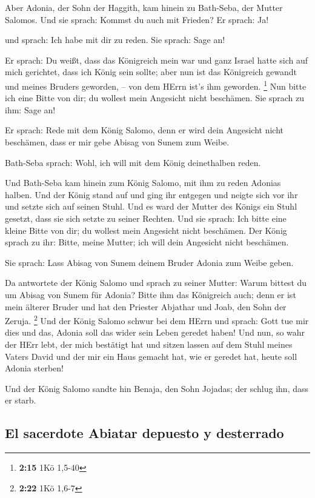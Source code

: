  Aber Adonia, der Sohn der Haggith, kam hinein zu
Bath-Seba, der Mutter Salomos. Und sie sprach: Kommst du auch mit
Frieden? Er sprach: Ja!

 und sprach: Ich habe mit dir zu reden. Sie sprach: Sage
an!

 Er sprach: Du weißt, dass das Königreich mein war und
ganz Israel hatte sich auf mich gerichtet, dass ich König sein sollte;
aber nun ist das Königreich gewandt und meines Bruders geworden, -- von
dem HErrn ist's ihm geworden. \footnote{\textbf{2:15} 1Kö 1,5-40}
 Nun bitte ich eine Bitte von dir; du wollest mein
Angesicht nicht beschämen. Sie sprach zu ihm: Sage an!

 Er sprach: Rede mit dem König Salomo, denn er wird dein
Angesicht nicht beschämen, dass er mir gebe Abisag von Sunem zum Weibe.

 Bath-Seba sprach: Wohl, ich will mit dem König
deinethalben reden.

 Und Bath-Seba kam hinein zum König Salomo, mit ihm zu
reden Adonias halben. Und der König stand auf und ging ihr entgegen und
neigte sich vor ihr und setzte sich auf seinen Stuhl. Und es ward der
Mutter des Königs ein Stuhl gesetzt, dass sie sich setzte zu seiner
Rechten.  Und sie sprach: Ich bitte eine kleine Bitte von
dir; du wollest mein Angesicht nicht beschämen. Der König sprach zu ihr:
Bitte, meine Mutter; ich will dein Angesicht nicht beschämen.

 Sie sprach: Lass Abisag von Sunem deinem Bruder Adonia
zum Weibe geben.

 Da antwortete der König Salomo und sprach zu seiner
Mutter: Warum bittest du um Abisag von Sunem für Adonia? Bitte ihm das
Königreich auch; denn er ist mein älterer Bruder und hat den Priester
Abjathar und Joab, den Sohn der Zeruja. \footnote{\textbf{2:22} 1Kö
  1,6-7}  Und der König Salomo schwur bei dem HErrn und
sprach: Gott tue mir dies und das, Adonia soll das wider sein Leben
geredet haben!  Und nun, so wahr der HErr lebt, der mich
bestätigt hat und sitzen lassen auf dem Stuhl meines Vaters David und
der mir ein Haus gemacht hat, wie er geredet hat, heute soll Adonia
sterben!

 Und der König Salomo sandte hin Benaja, den Sohn
Jojadas; der schlug ihn, dass er starb.

\hypertarget{el-sacerdote-abiatar-depuesto-y-desterrado}{%
\subsection{El sacerdote Abiatar depuesto y
desterrado}\label{el-sacerdote-abiatar-depuesto-y-desterrado}}

